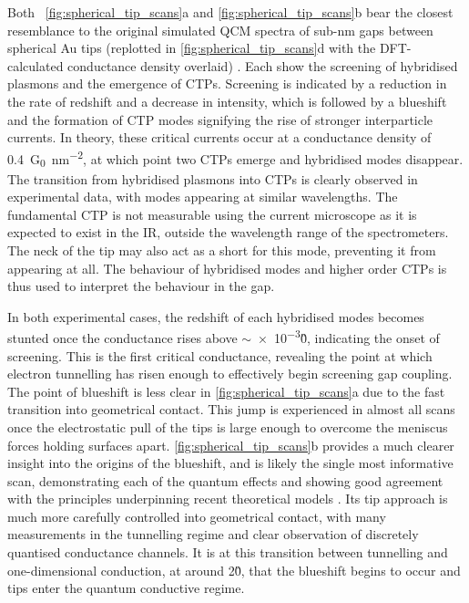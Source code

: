 \documentclass[a4paper, 11pt]{article}
\begin{document}
Both \figurenames~\ref{fig:spherical_tip_scans}a and \ref{fig:spherical_tip_scans}b bear the closest resemblance to the original simulated QCM spectra of sub-nm gaps between spherical Au tips (replotted in \autoref{fig:spherical_tip_scans}d with the DFT-calculated conductance density overlaid) \cite{savage2012}. Each show the screening of hybridised plasmons and the emergence of CTPs. Screening is indicated by a reduction in the rate of redshift and a decrease in intensity, which is followed by a blueshift and the formation of CTP modes signifying the rise of stronger interparticle currents. In theory, these critical currents occur at a conductance density of \SI{0.4}{G_0.nm^{-2}}, at which point two CTPs emerge and hybridised modes disappear. The transition from hybridised plasmons into CTPs is clearly observed in experimental data, with modes appearing at similar wavelengths. The fundamental CTP is not measurable using the current microscope as it is expected to exist in the IR, outside the wavelength range of the spectrometers. The neck of the tip may also act as a short for this mode, preventing it from appearing at all. The behaviour of hybridised modes and higher order CTPs is thus used to interpret the behaviour in the gap.

In both experimental cases, the redshift of each hybridised modes becomes stunted once the conductance rises above $\sim$\num{e-3}\G0, indicating the onset of screening. This is the first critical conductance, revealing the point at which electron tunnelling has risen enough to effectively begin screening gap coupling. The point of blueshift is less clear in \autoref{fig:spherical_tip_scans}a due to the fast transition into geometrical contact. This jump is experienced in almost all scans once the electrostatic pull of the tips is large enough to overcome the meniscus forces holding surfaces apart. \autoref{fig:spherical_tip_scans}b provides a much clearer insight into the origins of the blueshift, and is likely the single most informative scan, demonstrating each of the quantum effects and showing good agreement with the principles underpinning recent theoretical models \cite{zuloaga2009, savage2012}. Its tip approach is much more carefully controlled into geometrical contact, with many measurements in the tunnelling regime and clear observation of discretely quantised conductance channels. It is at this transition between tunnelling and one-dimensional conduction, at around 2\G0, that the blueshift begins to occur and tips enter the quantum conductive regime.
\end{document}
